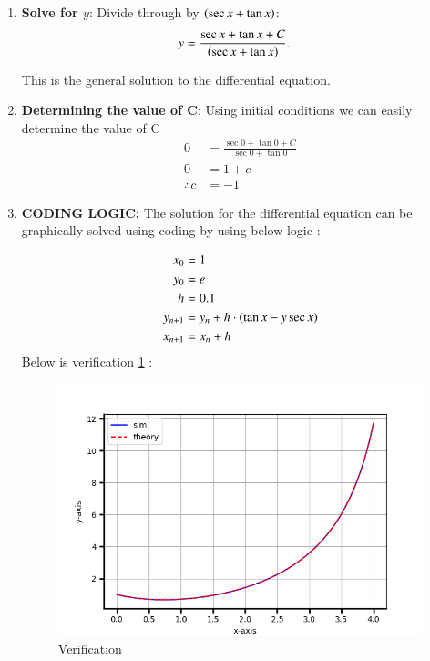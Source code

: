 \documentclass[journal]{IEEEtran}
\begin{document}
\begin{enumerate}
  \item \textbf{Solve for $y$}:
  Divide through by $\left(\sec x + \tan x\right)$:
  \begin{align}                                                                      y &= \frac{\sec x + \tan x + C}{\left(\sec x + \tan x\right)}.
  \end{align} 

  This is the general solution to the differential equation.
 \item \textbf{Determining the value of C}:
    Using initial conditions we can easily determine the value of C
    \begin{align}    
	    0 &= \frac{\sec {0} + \tan {0}+C}{\sec{0}+\tan{0}} \\
	    0 &= 1+c \\
	    \therefore c &= -1
    \end{align}
    \item \textbf{CODING LOGIC:} The solution for the differential equation can be graphically solved using coding by using below logic :

\begin{align} 
	x_0 &= 1 \\ 
	y_0 &= e  \\
	h&=0.1 \\
	y_{n+1} &= y_{n} + h\cdot\left(\tan{x}-y\sec{x}\right) \\ 
	x_{n+1} &= x_{n} + h 
\end{align}
\newpage
Below is verification \ref{fig:example} :
\begin{figure}[h]  %
    \centering  %
    \includegraphics[width=\columnwidth]{fig/Figure_1.png}  
    \caption{Verification}
    \label{fig:example}  %
\end{figure}
\end{enumerate}
               
\end{document}
